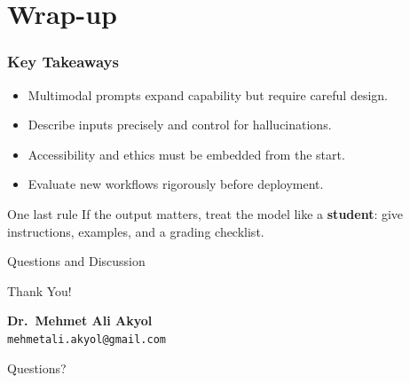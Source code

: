 \documentclass{beamer}
\begin{document}
\section{Wrap-up}

\begin{frame}
    \frametitle{Key Takeaways}
    \begin{itemize}
        \item Multimodal prompts expand capability but require careful design.
        \item Describe inputs precisely and control for hallucinations.
        \item Accessibility and ethics must be embedded from the start.
        \item Evaluate new workflows rigorously before deployment.
    \end{itemize}
    \begin{block}{One last rule}
        If the output matters, treat the model like a \textbf{student}: give instructions, examples, and a grading checklist.
    \end{block}
\end{frame}

\begin{frame}{Questions and Discussion}
    \begin{center}
    {\Huge Thank You!}
    \vspace{1cm}

        \textbf{Dr.\ Mehmet Ali Akyol}\\
        \texttt{mehmetali.akyol@gmail.com}
    \vspace{1cm}

    {\large Questions?}
    \end{center}
\end{frame}
\end{document}
